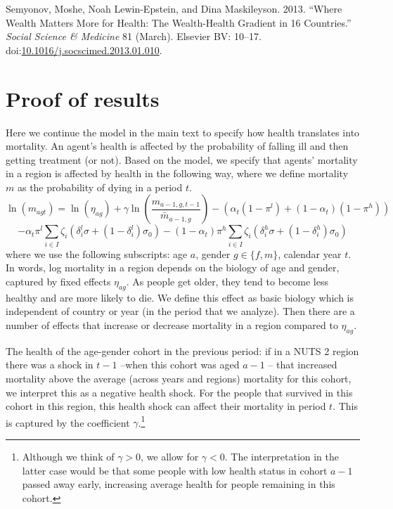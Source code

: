 \documentclass[a4paper,12pt]{article}
\begin{document}
\hypertarget{citeproc_bib_item_25}{Semyonov, Moshe, Noah Lewin-Epstein, and Dina Maskileyson. 2013. “Where Wealth Matters More for Health: The Wealth-Health Gradient in 16 Countries.” \textit{Social Science \& Medicine} 81 (March). Elsevier BV: 10–17. doi:\href{https://doi.org/10.1016/j.socscimed.2013.01.010}{10.1016/j.socscimed.2013.01.010}.}\bigskip



\newpage
\appendix

\section{Proof of results}
\label{sec:org857a4ba}
\label{sec:proofs_appendix}


Here we continue the model in the main text to specify how health translates into mortality. An agent's health is affected by the probability of falling ill and then getting treatment (or not). Based on the model, we specify that agents' mortality in a region is affected by health in the following way, where we define mortality \(m\) as the probability of dying in a period \(t\).
\begin{equation}
\label{eq:health}
\ln(m_{agt}) = \ln({\eta}_{ag}) + \gamma \ln \left( \frac{m_{a-1,g,t-1}}{\bar m_{a-1,g}}\right) - (\alpha_t (1-\pi^l) + (1-\alpha_t) (1-\pi^{h}))
\end{equation}
\begin{equation*}
 - \alpha_{t} \pi^l \sum_{i \in I} \zeta_i (\delta_i^l \sigma + (1-\delta_i^l)\sigma_0) - (1-\alpha_{t}) \pi^h \sum_{i \in I} \zeta_i (\delta_i^h \sigma + (1-\delta_i^h) \sigma_0)
\end{equation*}
where we use the following subscripts: age \(a\), gender \(g \in \{f,m\}\), calendar year \(t\). In words, log mortality in a region depends on the biology of age and gender, captured by fixed effects \(\eta_{ag}\). As people get older, they tend to become less healthy and are more likely to die. We define this effect as basic biology which is independent of country or year (in the period that we analyze). Then there are a number of effects that increase or decrease mortality in a region compared to \(\eta_{ag}\).

The health of the age-gender cohort in the previous period: if in a NUTS 2 region there was a shock in \(t-1\) --when this cohort was aged \(a-1\) -- that increased mortality above the average (across years and regions) mortality for this cohort, we interpret this as a negative health shock. For the people that survived in this cohort in this region, this health shock can affect their mortality in period \(t\). This is captured by the coefficient \(\gamma\).\footnote{Although we think of \(\gamma>0\), we allow for \(\gamma<0\). The interpretation in the latter case would be that some people with low health status in cohort \(a-1\) passed away early, increasing average health for people remaining in this cohort.}
\end{document}
